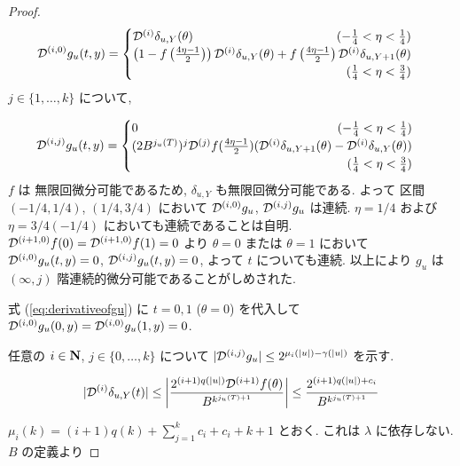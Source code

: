 \begin{proof}
  \begin{equation}
   \label{eq:derivativeofgu}
    \D{i,0} g_u(t, y)
     = \begin{cases}
 	\D{i} \delta_{u, Y}(\theta) 
	\hfill (- \frac 1 4 < \eta < \frac 1 4) \\
	\left( 1-f \left(\frac{4\eta-1}{2}\right)\right) 
	\D{i} \delta_{u, Y}(\theta) 
	+ f \left(\frac{4\eta-1}{2}\right) \D{i} \delta_{u,Y+1}(\theta) \\
	\hfill (\frac 1 4 < \eta < \frac 3 4)
       \end{cases}
  \end{equation}   
  $j \in \{1, \dots , k\}$ について,

  \begin{equation}
    \D{i,j} g_u(t, y)
     = \begin{cases}
	0 \hfill (- \frac 1 4 < \eta < \frac 1 4) \\
	(2B^{j_u(T)})^j \D{j}f(\frac{4\eta - 1}2)
	(\D{i}\delta_{u,Y+1}(\theta)-\D{i}\delta_{u, Y}(\theta)) \\
	\hfill (\frac 1 4 < \eta < \frac 3 4)
       \end{cases}
  \end{equation}
  $f$ は 無限回微分可能であるため, $\delta_{u,Y}$ も無限回微分可能である.
  よって 区間 $(-1/4, 1/4)$, $(1/4, 3/4)$ において
  $\mathcal D^{(i, 0)} g_u$, $\mathcal D^{(i,j)} g_u$ は連続. 
  $\eta = 1/4$ および  $\eta = 3/4(-1/4)$ においても連続であることは自明.
  $\mathcal D^{(i+1, 0)} f(0) = \mathcal D^{(i+1, 0)} f(1) = 0$ より $\theta = 0$ または $\theta = 1$
  において $\mathcal D^{(i, 0)}g_u(t, y) = 0$, $\mathcal D^{(i, j)}g_u(t, y) = 0$,
  よって $t$ についても連続.
  以上により $g_u$ は $(\infty, j)$ 階連続的微分可能であることがしめされた.

  式 (\ref{eq:derivativeofgu}) に $t = 0, 1$ ($\theta = 0$) を代入して
  $\mathcal D^{(i, 0)} g_u(0,y) = \mathcal D^{(i, 0)} g_u(1,y) = 0$.

  任意の $i \in \mathbf N$, $j \in \{0, \dots, k\}$ について
  $|\mathcal D^{(i,j)} g_u| \leq 2^{\mu_i (|u|) - \gamma(|u|)}$ を示す.

  \begin{equation}
   |\mathcal D^{(i)}\delta_{u, Y}(t)| 
    \le \left|\frac{2^{(i+1)q(|u|)}\mathcal D^{(i+1)}f(\theta)}{B^{k^{j_u(T)+1}}} \right|
    \le \frac{2^{(i+1)q(|u|) + c_i}}{B^{k^{j_u(T)+1}}}\\
  \end{equation}

  $\mu_i(k) = (i+1)q(k) + \sum^k_{j=1}c_i + c_i + k + 1$ とおく.
  これは $\lambda$ に依存しない.
  $B$ の定義より


\end{proof}
